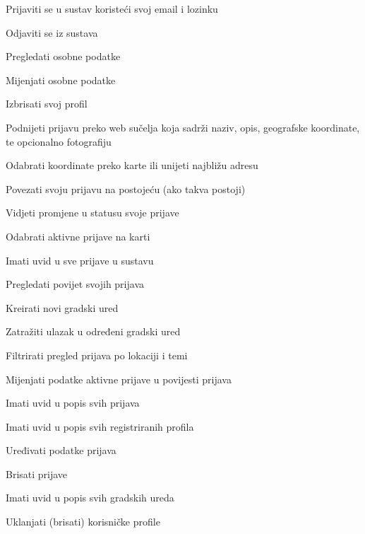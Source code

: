 			
			\begin{packed_enum}
				\item  {}
				
				\begin{packed_enum}
					
					\item Prijaviti se u sustav koristeći svoj email i lozinku
					\item Odjaviti se iz sustava
					\item Pregledati osobne podatke
					\item Mijenjati osobne podatke
					\item Izbrisati svoj profil
					\item Podnijeti prijavu preko web sučelja koja sadrži naziv, opis, geografske koordinate, te opcionalno fotografiju
					\item Odabrati koordinate preko karte ili unijeti najbližu adresu
					\item Povezati svoju prijavu na postojeću (ako takva postoji)
					\item Vidjeti promjene u statusu svoje prijave
					\item Odabrati aktivne prijave na karti
					\item Imati uvid u sve prijave u sustavu
					\item Pregledati povijet svojih prijava
					\item Kreirati novi gradski ured
					\item Zatražiti ulazak u određeni gradski ured
					\item Filtrirati pregled prijava po lokaciji i temi
					\item Mijenjati podatke aktivne prijave u povijesti prijava
				\end{packed_enum}
				
				\pagebreak
			
				\item  {}
				
				\begin{packed_enum}
					
					\item Imati uvid u popis svih prijava
					\item Imati uvid u popis svih registriranih profila
					\item Uređivati podatke prijava
					\item Brisati prijave
					\item Imati uvid u popis svih gradskih ureda
					\item Uklanjati (brisati) korisničke profile
				\end{packed_enum}
				

\end{packed_enum}
